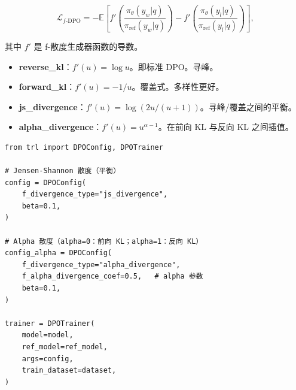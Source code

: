 \[
\mathcal{L}_{f\text{-DPO}} = -\mathbb{E}\!\left[
    f'\!\left(\frac{\pi_\theta(y_w|q)}{\pi_{\text{ref}}(y_w|q)}\right)
    - f'\!\left(\frac{\pi_\theta(y_l|q)}{\pi_{\text{ref}}(y_l|q)}\right)
  \right],
\]

其中 $f'$ 是 f-散度生成器函数的导数。

\begin{keybox}
\begin{itemize}
  \item \textbf{reverse\_kl}：$f'(u) = \log u$。即标准 DPO。寻峰。
  \item \textbf{forward\_kl}：$f'(u) = -1/u$。覆盖式。多样性更好。
  \item \textbf{js\_divergence}：$f'(u) = \log(2u/(u+1))$。寻峰/覆盖之间的平衡。
  \item \textbf{alpha\_divergence}：$f'(u) = u^{\alpha-1}$。在前向 KL 与反向 KL 之间插值。
\end{itemize}
\end{keybox}

\begin{examplebox}
\begin{lstlisting}[style=pythonstyle]
from trl import DPOConfig, DPOTrainer

# Jensen-Shannon 散度（平衡）
config = DPOConfig(
    f_divergence_type="js_divergence",
    beta=0.1,
)

# Alpha 散度（alpha=0：前向 KL；alpha=1：反向 KL）
config_alpha = DPOConfig(
    f_divergence_type="alpha_divergence",
    f_alpha_divergence_coef=0.5,   # alpha 参数
    beta=0.1,
)

trainer = DPOTrainer(
    model=model,
    ref_model=ref_model,
    args=config,
    train_dataset=dataset,
)
\end{lstlisting}
\end{examplebox}

